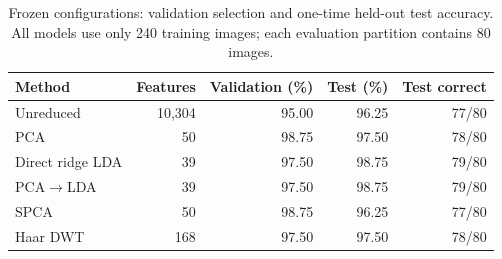 \begin{table}[htbp]
\centering
\small
\caption{Frozen configurations: validation selection and one-time held-out test accuracy. All models use only 240 training images; each evaluation partition contains 80 images.}
\label{tab:final-test}
\begin{tabular}{lrrrr}
\hline
Method & Features & Validation (\%) & Test (\%) & Test correct \\
\hline
Unreduced & 10,304 & 95.00 & 96.25 & 77/80 \\
PCA & 50 & 98.75 & 97.50 & 78/80 \\
Direct ridge LDA & 39 & 97.50 & 98.75 & 79/80 \\
PCA$\rightarrow$LDA & 39 & 97.50 & 98.75 & 79/80 \\
SPCA & 50 & 98.75 & 96.25 & 77/80 \\
Haar DWT & 168 & 97.50 & 97.50 & 78/80 \\
\hline
\end{tabular}
\end{table}
